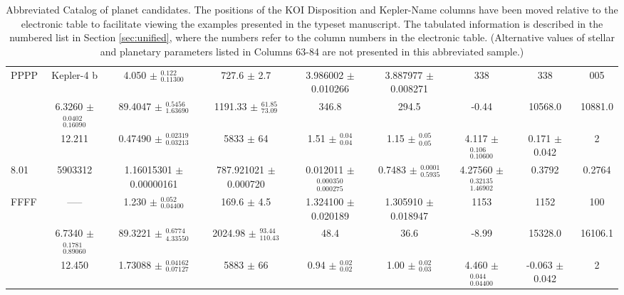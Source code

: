 \documentclass{aastex62}
\begin{document}
\begin{longrotatetable}
\begin{table}[!hbt]
\begin{tabular}{l c c c c c c c c}
PPPP & Kepler-4 b & 4.050 $\pm$ $^{ 0.122 } _{ 0.11300 }$ & 727.6 $\pm$ 2.7 & 3.986002 $\pm$ 0.010266 & 3.887977 $\pm$ 0.008271 & 338 & 338 & 005 \\
& 6.3260 $\pm$ $^{ 0.0402 } _{ 0.16090 }$ & 89.4047 $\pm$ $^{ 0.5456 } _{ 1.63690 }$ & 1191.33 $\pm$ $^{ 61.85 } _{ 73.09 }$ & 346.8 & 294.5 & -0.44 & 10568.0 & 10881.0 \\
& 12.211 & 0.47490 $\pm$ $^{ 0.02319 } _{ 0.03213 }$ & 5833 $\pm$ 64 & 1.51 $\pm$ $^{ 0.04 } _{ 0.04 }$ & 1.15 $\pm$ $^{ 0.05 } _{ 0.05 }$ & 4.117 $\pm$ $^{ 0.106 } _{ 0.10600 }$ & 0.171 $\pm$ 0.042 & 2 \\
[.2cm]
8.01 & 5903312 & 1.16015301 $\pm$ 0.00000161 & 787.921021 $\pm$ 0.000720 & 0.012011 $\pm$ $^{ 0.000350 } _{ 0.000275 }$ & 0.7483 $\pm$ $^{ 0.0001 } _{ 0.5935 }$ & 4.27560 $\pm$ $^{ 0.32135 } _{ 1.46902 }$ & 0.3792 & 0.2764 \\
FFFF & ----- & 1.230 $\pm$ $^{ 0.052 } _{ 0.04400 }$ & 169.6 $\pm$ 4.5 & 1.324100 $\pm$ 0.020189 & 1.305910 $\pm$ 0.018947 & 1153 & 1152 & 100 \\
& 6.7340 $\pm$ $^{ 0.1781 } _{ 0.89060 }$ & 89.3221 $\pm$ $^{ 0.6774 } _{ 4.33550 }$ & 2024.98 $\pm$ $^{ 93.44 } _{ 110.43 }$ & 48.4 & 36.6 & -8.99 & 15328.0 & 16106.1 \\
& 12.450 & 1.73088 $\pm$ $^{ 0.04162 } _{ 0.07127 }$ & 5883 $\pm$ 66 & 0.94 $\pm$ $^{ 0.02 } _{ 0.02 }$ & 1.00 $\pm$ $^{ 0.02 } _{ 0.03 }$ & 4.460 $\pm$ $^{ 0.044 } _{ 0.04400 }$ & -0.063 $\pm$ 0.042 & 2 \\
    \end{tabular}
    \caption{Abbreviated Catalog of planet candidates. The positions of the KOI Disposition and Kepler-Name columns have been moved relative to the electronic table to facilitate viewing the examples presented in the typeset manuscript. The tabulated information is described in the numbered list in Section \ref{sec:unified}, where the numbers refer to the column numbers in the electronic table. (Alternative values of stellar and planetary parameters listed in Columns 63-84 are not presented in this abbreviated sample.)}
    \label{tab:planetcatalog}
\end{table}
\end{longrotatetable}
\end{document}
